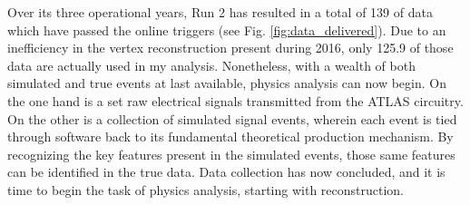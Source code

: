         Over its three operational years, Run 2 has resulted in a total of 139 \ifb of data which have passed the online triggers
            (see Fig. \ref{fig:data_delivered}).
        Due to an inefficiency in the vertex reconstruction present during 2016,
            only 125.9 \ifb of those data are actually used in my analysis.
        Nonetheless, with a wealth of both simulated and true events at last available, 
            physics analysis can now begin.
        On the one hand is a set raw electrical signals transmitted from the ATLAS circuitry.
        On the other is a collection of simulated signal events,
            wherein each event is tied through software back to its fundamental theoretical production mechanism.
        By recognizing the key features present in the simulated events,
            those same features can be identified in the true data.
        Data collection has now concluded, and it is time to begin the task of physics analysis,
            starting with reconstruction.
